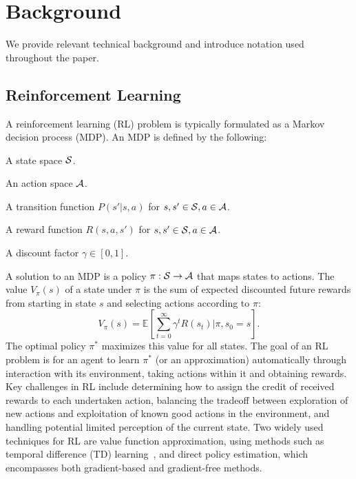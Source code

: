 \section{Background}
We provide relevant technical background and introduce notation
used throughout the paper.

\subsection{Reinforcement Learning}
A reinforcement learning (RL) problem is typically formulated as
a Markov decision process (MDP). An MDP is defined by the following:

\begin{tightlist}
\item A state space $\mathcal{S}$.
\item An action space $\mathcal{A}$.
\item A transition function $P(s' | s, a)$ for $s, s' \in \mathcal{S}, a \in \mathcal{A}$.
\item A reward function $R(s, a, s')$ for $s, s' \in \mathcal{S}, a \in \mathcal{A}$.
\item A discount factor $\gamma \in [0, 1]$.
\end{tightlist}
A solution to an MDP is a policy $\pi: \mathcal{S} \rightarrow \mathcal{A}$ that maps states to
actions. The value $V_{\pi}(s)$ of a state under $\pi$ is the sum of expected
discounted future rewards from starting in state $s$ and selecting actions according
to $\pi$:
$$V_{\pi}(s) = \mathbb{E}[\sum_{t=0}^{\infty}\gamma^{t}R(s_{t}) | \pi, s_{0} = s].$$
The optimal policy $\pi^{*}$ maximizes this value for all states. The goal of an RL
problem is for an agent to learn $\pi^{*}$ (or an approximation) automatically
through interaction with its environment, taking actions within it and obtaining
rewards. Key challenges in RL include determining how to assign
the credit of received rewards to each undertaken action, balancing the tradeoff between
exploration of new actions and exploitation of known good actions in the environment, and handling
potential limited perception of the current state. Two widely used techniques for RL are value
function approximation, using methods such as temporal difference (TD) learning~\cite{suttonbarto},
and direct policy estimation, which encompasses both gradient-based and gradient-free methods.

